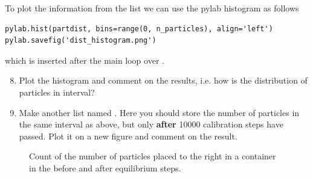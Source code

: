 \documentclass{article}
\begin{document}
To plot the information from the list we can use the pylab histogram as follows

\begin{lstlisting}
pylab.hist(partdist, bins=range(0, n_particles), align='left')
pylab.savefig('dist_histogram.png')
\end{lstlisting}

which is inserted after the main loop over .

\begin{enumerate}
  \setcounter{enumi}{7}
  \item Plot the histogram and comment on the results, i.e. how is the
    distribution of particles in interval?

  \item Make another list named . Here you should store the
    number of particles in the same interval as above, but only {\bf after}
    10000 calibration steps have passed. Plot it on a new figure and comment
    on the result.

\end{enumerate}

\begin{figure}[htb]
  \label{fig:partdist}
  \caption{
     Count of the number of particles placed to the right in a container in the
     before and after equilibrium steps.
  }
\end{figure}



\end{document}
